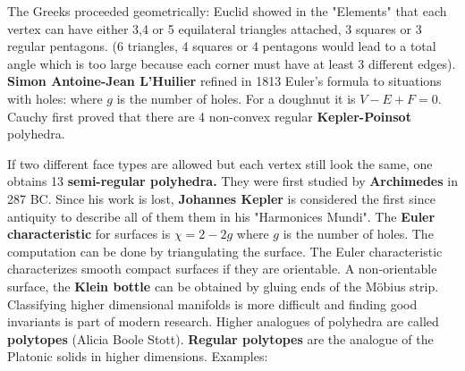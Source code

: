 \documentclass[12pt]{amsart}
\begin{document}
The Greeks proceeded geometrically: Euclid showed
in the "Elements" that each vertex can have either 3,4 or 5 equilateral triangles attached,
3 squares or 3 regular pentagons. (6 triangles, 4 squares or 4 pentagons would lead to 
a total angle which is too large because each corner must have at least 3 different edges).
{\bf Simon Antoine-Jean L'Huilier} refined in 1813 Euler's formula to situations with holes:
where $g$ is the number of holes. For a doughnut it is $V-E+F=0$.
Cauchy first proved that there are 4 non-convex regular {\bf Kepler-Poinsot} polyhedra.
\begin{small}
\begin{center}  \end{center}
\end{small}
If two different face types are allowed but each vertex still look the same, one obtains
13 {\bf semi-regular polyhedra.} They were first studied by {\bf Archimedes} in 287 BC.
Since his work is lost, {\bf Johannes Kepler} is considered the first
since antiquity to describe all of them them in his "Harmonices Mundi". 
The {\bf Euler characteristic} for surfaces is $\chi=2-2g$ where $g$ is the number of holes. 
The computation can be done by triangulating the surface. 
The Euler characteristic characterizes smooth compact surfaces if they are orientable. A non-orientable 
surface, the {\bf Klein bottle} can be obtained by gluing ends of the  M\"obius strip.
Classifying higher dimensional manifolds is more difficult and finding good invariants 
is part of modern research. Higher analogues of polyhedra are called {\bf polytopes} 
(Alicia Boole Stott). {\bf Regular polytopes} are the analogue 
of the Platonic solids in higher dimensions. Examples:
\end{document}
